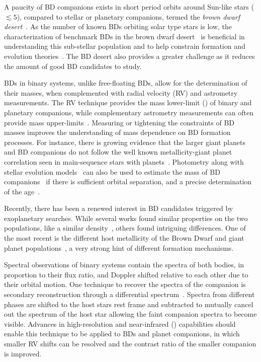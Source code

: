 A paucity of BD companions exists in short period orbits around Sun-like stars (\(\lesssim5 \)\AU), compared to stellar or planetary companions, termed the \emph{brown dwarf desert}~\citep{halbwachs_exploring_2000, zucker_analysis_2001, sahlmann_search_2011}.
As the number of known BDs orbiting solar type stars is low, the characterization of benchmark BDs in the brown dwarf desert~\citep[e.g.][]{crepp_trends_2016} is beneficial in understanding this sub-stellar population and to help constrain formation and evolution theories~\citep{whitworth_formation_2007}.
The BD desert also provides a greater challenge as it reduces the amount of good BD candidates to study.

BDs in binary systems, unlike free-floating BDs, allow for the determination of their masses, when complemented with radial velocity ({RV}) and astrometry measurements.
The {RV} technique provides the mass lower-limit (\mtwosini{}) of binary and planetary companions, while complementary astrometry measurements can often provide mass upper-limits~\citep[e.g.][]{sahlmann_search_2011}.
Measuring or tightening the constraints of BD masses improves the understanding of mass dependence on BD formation processes.
For instance, there is growing evidence that the larger giant planets and BD companions do not follow the well known metallicity-giant planet correlation seen in main-sequence stars with planets~\citep[e.g.][]{santos_spectroscopic_2004,santos_observational_2017, maldonado_searching_2017}.
Photometry along with stellar evolution models~\citep[e.g.][]{baraffe_evolutionary_2003,allard_btsettl_2013} can also be used to estimate the mass of BD companions~\citep[e.g.][]{moutou_eccentricity_2017} if there is sufficient orbital separation, and a precise determination of the age~\citep{soderblom_ages_2010}.

Recently, there has been a renewed interest in BD candidates triggered by exoplanetary searches.
While several works found similar properties on the two populations, like a similar density~\citep{hatzes_definition_2015}, others found intriguing differences.
One of the most recent is the different host metallicity of the Brown Dwarf and giant planet populations~\citep{santos_observational_2017, schlaufman_evidence_2018}, a very strong hint of different formation mechanisms.

Spectral observations of binary systems contain the spectra of both bodies, in proportion to their flux ratio, and Doppler shifted relative to each other due to their orbital motion.
One technique to recover the spectra of the companion is secondary reconstruction through a differential spectrum~\citep{ferluga_separating_1997}.
Spectra from different phases are shifted to the host stars rest frame and subtracted to mutually cancel out the spectrum of the host star allowing the faint companion spectra to become visible.
Advances in high-resolution and near-infrared (\nir{}) capabilities should enable this technique to be applied to BDs and planet companions, in which smaller {RV} shifts can be resolved and the contrast ratio of the smaller companion is improved.

